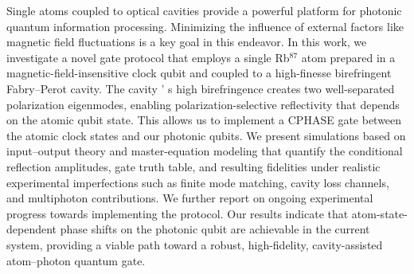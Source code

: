\documentclass{scdpg}
\begin{document}
\begin{scAbstract}
\scBeginText
Single atoms coupled to optical cavities provide a powerful platform for photonic quantum information processing. Minimizing the influence of external factors like magnetic field fluctuations is a key goal in this endeavor. In this work, we investigate a novel gate protocol that employs a single Rb$^{87}$ atom prepared in a magnetic-field-insensitive clock qubit and coupled to a high-finesse birefringent Fabry–Perot cavity. The cavity ’ s high birefringence creates two well-separated polarization eigenmodes, enabling polarization-selective reflectivity that depends on the atomic qubit state. This allows us to implement a CPHASE gate between the atomic clock states and our photonic qubits. We present simulations based on input–output theory and master-equation modeling that quantify the conditional reflection amplitudes, gate truth table, and resulting fidelities under realistic experimental imperfections such as finite mode matching, cavity loss channels, and multiphoton contributions. We further report on ongoing experimental progress towards implementing the protocol. Our results indicate that atom-state-dependent phase shifts on the photonic qubit are achievable in the current system, providing a viable path toward a robust, high-fidelity, cavity-assisted atom–photon quantum gate.
\scEndText
{}
\end{scAbstract}
\end{document}
